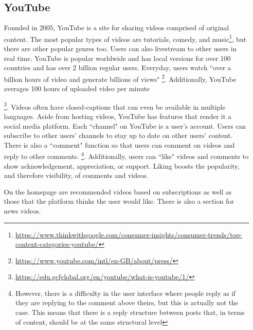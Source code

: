 {{\subsection{YouTube}
Founded in 2005, YouTube is a site for sharing videos comprised of original content. The most popular types of videos are tutorials, comedy, and music\footnote{\href{https://www.thinkwithgoogle.com/consumer-insights/consumer-trends/top-content-categories-youtube/}{https://www.thinkwithgoogle.com/consumer-insights/consumer-trends/top-content-categories-youtube/}}, but there are other popular genres too. Users can also livestream to other users in real time.
YouTube is popular worldwide and has local versions for over 100 countries and has over 2 billion regular users. Everyday, users watch ``over a billion hours of video and generate billions of views" \footnote{\href{https://www.youtube.com/intl/en-GB/about/press/}{https://www.youtube.com/intl/en-GB/about/press/}}.
Additionally, YouTube averages 100 hours of uploaded video per minute{\footnote{\href{https://edu.gcfglobal.org/en/youtube/what-is-youtube/1/}{https://edu.gcfglobal.org/en/youtube/what-is-youtube/1/}}. Videos often have closed-captions that can even be available in multiple languages.
Aside from hosting videos, YouTube has features that render it a social media platform. Each ``channel" on YouTube is a user's account. Users can subscribe to other users' channels to stay up to date on other users' content. There is also a ``comment" function so that users can comment on videos and reply to other comments. \footnote{However, there is a difficulty in the user interface where people reply as if they are replying to the comment above theirs, but this is actually not the case. This means that there is a reply structure between posts that, in terms of content, should be at the same structural level}.
Additionally, users can ``like" videos and comments to show acknowledgement, appreciation, or support. Liking boosts the popularity, and therefore visibility, of comments and videos. 
\par On the homepage are recommended videos based on subscriptions as well as those that the platform thinks the user would like. There is also a section for news videos. 

}}}
